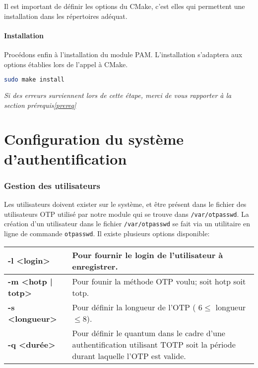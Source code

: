 \documentclass{"../../../res/univ-projet"}
\begin{document}
Il est important de définir les options du CMake, c'est elles qui permettent une installation dans les
répertoires adéquat. 

\subsection{Installation}
Procédons enfin à l'installation du module PAM. L'installation s'adaptera 
aux options établies lors de l'appel à CMake.
\begin{lstlisting}[language=bash, backgroundcolor=\color{black}, basicstyle=\color{white}]
sudo make install
\end{lstlisting}

\textit{Si des erreurs surviennent lors de cette étape, merci de vous 
rapporter à la section prérequis\ref{prereq}}


\newpage

\part{Configuration du système d'authentification}
\section{Gestion des utilisateurs}
Les utilisateurs doivent exister sur le système, et être présent dans 
le fichier des utilisateurs OTP utilisé par notre module qui se trouve 
dans \verb?/var/otpasswd?. La création d'un utilisateur dans le fichier 
\verb?/var/otpasswd? se fait via un utilitaire en ligne de commande 
\verb?otpasswd?. Il existe plusieurs options disponible:
\newline
\begin{tabular}{|p{}p{}|}
\hline
\textbf{-l <login>} & Pour fournir le login de l'utilisateur à enregistrer.\\
\hline
\textbf{-m <hotp | totp>} & Pour founir la méthode OTP voulu; soit hotp soit totp.\\
\hline
\textbf{-s <longueur>} & Pour définir la longueur de l'OTP ( $6 \leq$ longueur $\leq 8$).\\
\hline
\textbf{-q <durée>} & Pour définir le quantum dans le cadre d'une authentification utilisant 
TOTP soit la période durant laquelle l'OTP est valide.\\
\hline
\end{tabular}
\end{document}
